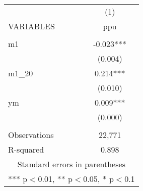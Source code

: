 \begin{tabular}{lc} \hline
 & (1) \\
VARIABLES & ppu \\ \hline
 &  \\
m1 & -0.023*** \\
 & (0.004) \\
m1\_20 & 0.214*** \\
 & (0.010) \\
ym & 0.009*** \\
 & (0.000) \\
 &  \\
Observations & 22,771 \\
 R-squared & 0.898 \\ \hline
\multicolumn{2}{c}{ Standard errors in parentheses} \\
\multicolumn{2}{c}{ *** p$<$0.01, ** p$<$0.05, * p$<$0.1} \\
\end{tabular}
